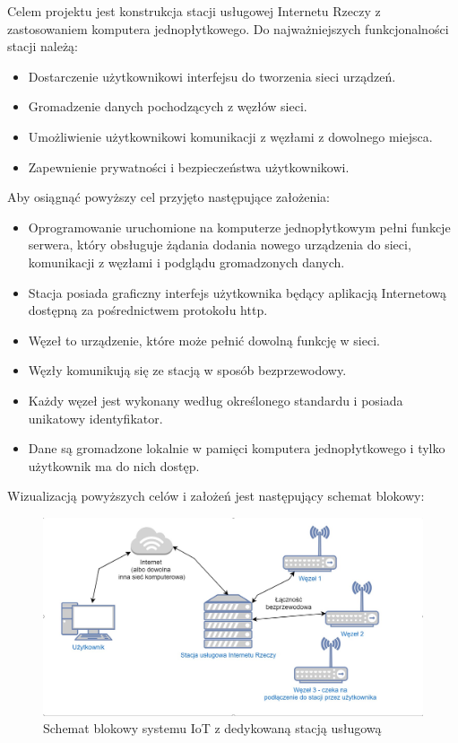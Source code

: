 \documentclass[12pt, twoside, openany]{mwrep}
\begin{document}
Celem projektu jest konstrukcja stacji usługowej Internetu Rzeczy z zastosowaniem komputera jednopłytkowego. Do najważniejszych funkcjonalności stacji należą:
\begin{itemize}
\item	Dostarczenie użytkownikowi interfejsu do tworzenia sieci urządzeń.
\item	Gromadzenie danych pochodzących z węzłów sieci.
\item	Umożliwienie użytkownikowi komunikacji z węzłami z dowolnego miejsca.
\item	Zapewnienie prywatności i bezpieczeństwa użytkownikowi.
\end{itemize}
Aby osiągnąć powyższy cel przyjęto następujące założenia:
\begin{itemize}
\item	Oprogramowanie uruchomione na komputerze jednopłytkowym pełni funkcje serwera, który obsługuje żądania dodania nowego urządzenia do sieci, komunikacji z węzłami i podglądu gromadzonych danych.
\item	Stacja posiada graficzny interfejs użytkownika będący aplikacją Internetową dostępną za pośrednictwem protokołu http.
\item	Węzeł to urządzenie, które może pełnić dowolną funkcję w sieci.
\item	Węzły komunikują się ze stacją w sposób bezprzewodowy.
\item Każdy węzeł jest wykonany według określonego standardu i posiada unikatowy identyfikator.
\item	Dane są gromadzone lokalnie w pamięci komputera jednopłytkowego i tylko użytkownik ma do nich dostęp. 
\end{itemize}
Wizualizacją powyższych celów i założeń jest następujący schemat blokowy:
\begin{figure}[H]
\centering
\includegraphics[scale=0.38]{zalozenia}
\caption{Schemat blokowy systemu IoT z dedykowaną stacją usługową}
\end{figure}
\end{document}
